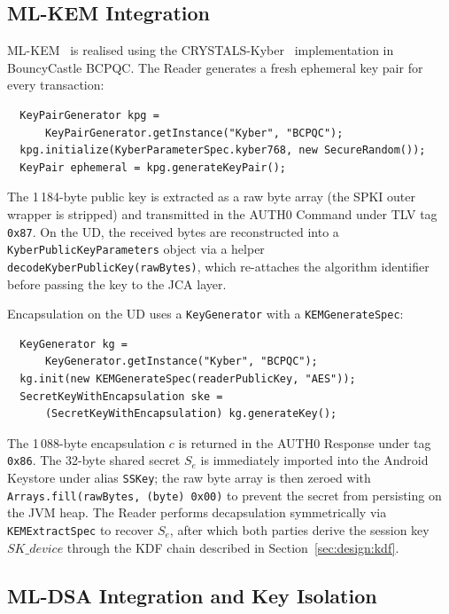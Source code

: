 \subsection{ML-KEM Integration}
\label{sec:impl:mlkem}

ML-KEM~\cite{NIST:FIPS203} is realised using the
CRYSTALS-Kyber~\cite{EuroSP:BDKLLSSSS18} implementation in BouncyCastle BCPQC.
The Reader generates a fresh ephemeral key pair for every transaction:

\begin{verbatim}
  KeyPairGenerator kpg =
      KeyPairGenerator.getInstance("Kyber", "BCPQC");
  kpg.initialize(KyberParameterSpec.kyber768, new SecureRandom());
  KeyPair ephemeral = kpg.generateKeyPair();
\end{verbatim}

\noindent
The 1\,184-byte public key is extracted as a raw byte array (the SPKI
outer wrapper is stripped) and transmitted in the AUTH0 Command under TLV
tag \texttt{0x87}.
On the UD, the received bytes are reconstructed into a
\texttt{KyberPublicKeyParameters} object via a helper
\texttt{decodeKyberPublicKey(rawBytes)}, which re-attaches the algorithm
identifier before passing the key to the JCA layer.

Encapsulation on the UD uses a \texttt{KeyGenerator} with a
\texttt{KEMGenerateSpec}:
\begin{verbatim}
  KeyGenerator kg =
      KeyGenerator.getInstance("Kyber", "BCPQC");
  kg.init(new KEMGenerateSpec(readerPublicKey, "AES"));
  SecretKeyWithEncapsulation ske =
      (SecretKeyWithEncapsulation) kg.generateKey();
\end{verbatim}

\noindent
The 1\,088-byte encapsulation $c$ is returned in the AUTH0 Response under
tag \texttt{0x86}.
The 32-byte shared secret $S_e$ is immediately imported into the Android
Keystore under alias \texttt{SSKey}; the raw byte array is then zeroed with
\texttt{Arrays.fill(rawBytes, (byte) 0x00)} to prevent the secret from
persisting on the JVM heap.
The Reader performs decapsulation symmetrically via \texttt{KEMExtractSpec}
to recover $S_e$, after which both parties derive the session key
$\mathit{SK\_device}$ through the KDF chain described in
Section~\ref{sec:design:kdf}.

\subsection{ML-DSA Integration and Key Isolation}
\label{sec:impl:isolation}

